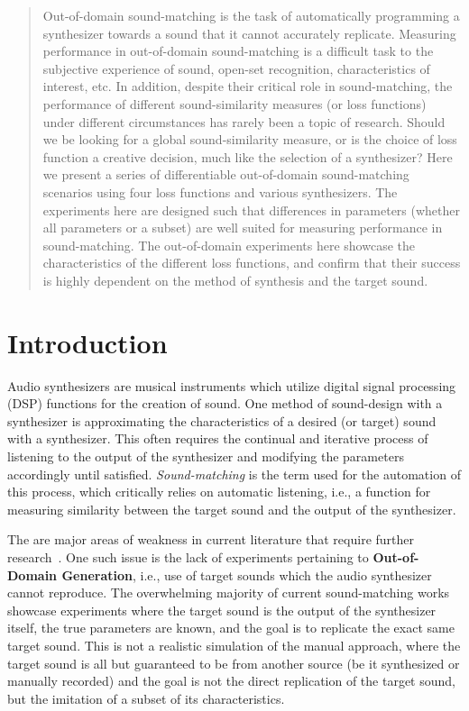 \documentclass[runningheads]{llncs}
\newcommand{\OutDomain}{\textbf{Out-of-Domain Generation}\xspace}
\begin{document}
\begin{abstract}
 Out-of-domain sound-matching is the task of automatically programming a synthesizer towards a sound that it cannot accurately replicate. Measuring performance in out-of-domain sound-matching is a difficult task to the subjective experience of sound, open-set recognition, characteristics of interest, etc. In addition, despite their critical role in sound-matching, the performance of different sound-similarity measures (or loss functions) under different circumstances has rarely been a topic of research. Should we be looking for a global sound-similarity measure, or is the choice of loss function a creative decision, much like the selection of a synthesizer?
 Here we present a series of differentiable out-of-domain sound-matching scenarios using four loss functions and various synthesizers. The experiments here are designed such that differences in parameters (whether all parameters or a subset) are well suited for measuring performance in sound-matching. The out-of-domain experiments here showcase the characteristics of the different loss functions, and confirm that their success is highly dependent on the method of synthesis and the target sound. 
\end{abstract}

\section{Introduction}
Audio synthesizers are musical instruments which utilize digital signal processing (DSP) functions for the creation of sound.  One method of sound-design with a synthesizer is approximating the characteristics of a desired (or target) sound with a synthesizer. This often requires the continual and iterative process of listening to the output of the synthesizer and modifying the parameters accordingly until satisfied. \textit{Sound-matching} is the term used for the automation of this process, which critically relies on automatic listening, i.e., a function for measuring similarity between the target sound and the output of the synthesizer. 

The are major areas of weakness in current literature that require further research~\cite{salimi2025soundmatching}. One such issue is the lack of experiments pertaining to \OutDomain, i.e., use of target sounds which the audio synthesizer cannot reproduce. The overwhelming majority of current sound-matching works showcase experiments where the target sound is the output of the synthesizer itself, the true parameters are known, and the goal is to replicate the exact same target sound. This is not a realistic simulation of the manual approach, where the target sound is all but guaranteed to be from another source (be it synthesized or manually recorded) and the goal is not the direct replication of the target sound, but the imitation of a subset of its characteristics.
\end{document}
